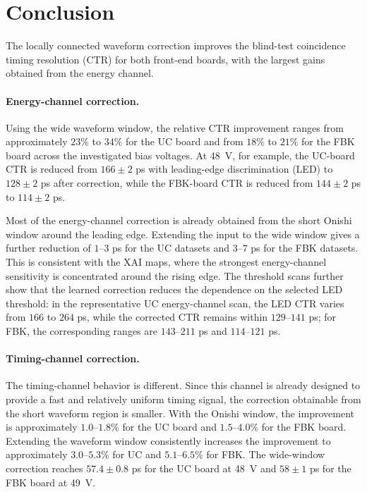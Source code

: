 \section{Conclusion}

The locally connected waveform correction improves the blind-test coincidence timing resolution (CTR) for both front-end boards, 
with the largest gains obtained from the energy channel.

\paragraph{Energy-channel correction.}
 
Using the wide waveform window, the relative CTR improvement ranges from approximately \(23\%\) to \(34\%\) for the UC board and from \(18\%\) to \(21\%\) 
for the FBK board across the investigated bias voltages. At \SI{48}{V}, for example, the UC-board CTR is reduced from \(166\pm2\) ps with leading-edge 
discrimination (LED) to \(128\pm2\) ps after correction, while the FBK-board CTR is reduced from \(144\pm2\) ps to \(114\pm2\) ps.

Most of the energy-channel correction is already obtained from the short Onishi window around the leading edge. Extending the input to the wide window 
gives a further reduction of \(1\)--\(3\) ps for the UC datasets and \(3\)--\(7\) ps for the FBK datasets. 
This is consistent with the XAI maps, where the strongest energy-channel sensitivity is concentrated around the rising edge. 
The threshold scans further show that the learned correction reduces the dependence on the selected LED threshold: 
in the representative UC energy-channel scan, the LED CTR varies from \(166\) to \(264\) ps, while the corrected CTR remains within \(129\)--\(141\) ps; 
for FBK, the corresponding ranges are \(143\)--\(211\) ps and \(114\)--\(121\) ps.

\paragraph{Timing-channel correction.}
The timing-channel behavior is different. Since this channel is already designed to provide a fast and relatively uniform timing signal, the correction 
obtainable from the short waveform region is smaller. With the Onishi window, the improvement is approximately \(1.0\)--\(1.8\%\) for the UC board and 
\(1.5\)--\(4.0\%\) for the FBK board. Extending the waveform window consistently increases the improvement to approximately \(3.0\)--\(5.3\%\) for UC 
and \(5.1\)--\(6.5\%\) for FBK. The wide-window correction reaches \(57.4\pm0.8\) ps for the UC board at \SI{48}{V} and \(58\pm1\) ps for the FBK board 
at \SI{49}{V}.


